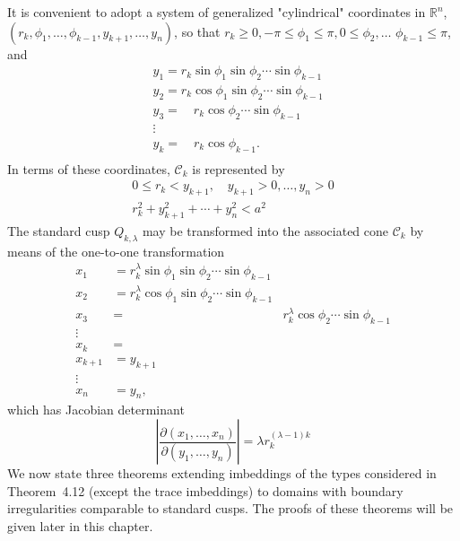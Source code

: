 \begin{para}
  It is convenient to adopt a system of generalized "cylindrical" coordinates
  in $\mathbb{R}^n$, $\left(r_k, \phi_1, \ldots, \phi_{k-1}, y_{k+1}, \ldots, y_n\right)$,
  so that $r_k \geq 0,-\pi \leq \phi_1 \leq \pi, 0 \leq \phi_2, \ldots$
  $\phi_{k-1} \leq \pi$, and
  \[
  \begin{aligned}
  & y_1=r_k \sin \phi_1 \sin \phi_2 \cdots \sin \phi_{k-1} \\
  & y_2=r_k \cos \phi_1 \sin \phi_2 \cdots \sin \phi_{k-1} \\
  & y_3=\quad r_k \cos \phi_2 \cdots \sin \phi_{k-1} \\
  & \vdots \\
  & y_k=\quad r_k \cos \phi_{k-1} \text {. } \\
  &
  \end{aligned}
  \]
  In terms of these coordinates, $\mathcal{C}_k$ is represented by
  \[
  \begin{gathered}
  0 \leq r_k<y_{k+1}, \quad y_{k+1}>0, \ldots, y_n>0 \\
  r_k^2+y_{k+1}^2+\cdots+y_n^2<a^2
  \end{gathered}
  \]
  The standard cusp $Q_{k, \lambda}$ may be transformed into the associated cone $\mathcal{C}_k$ by means of the one-to-one transformation
  \[
  \begin{array}{rlr}
  x_1 & =r_k^\lambda \sin \phi_1 \sin \phi_2 \cdots \sin \phi_{k-1} \\
  x_2 & =r_k^\lambda \cos \phi_1 \sin \phi_2 \cdots \sin \phi_{k-1} \\
  x_3 & = & r_k^\lambda \cos \phi_2 \cdots \sin \phi_{k-1} \\
  \vdots & \\
  x_k & = & \\
  x_{k+1} & =y_{k+1} & \\
  \vdots & \\
  x_n & =y_n,
  \end{array}
  \]
  which has Jacobian determinant
  \[
  \left|\frac{\partial\left(x_1, \ldots, x_n\right)}{\partial\left(y_1, \ldots, y_n\right)}\right|=\lambda r_k^{(\lambda-1) k}
  \]
  We now state three theorems extending imbeddings of the types considered in Theorem~4.12 
  (except the trace imbeddings) to domains with boundary irregularities comparable to standard 
  cusps. The proofs of these theorems will be given later in this chapter.
\end{para}


